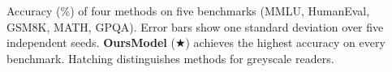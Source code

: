 \caption{Accuracy (\%) of four methods on five benchmarks (MMLU, HumanEval, GSM8K, MATH, GPQA).
Error bars show one standard deviation over five independent seeds.
\textbf{OursModel} ($\bigstar$) achieves the highest accuracy on every benchmark.
Hatching distinguishes methods for greyscale readers.}
